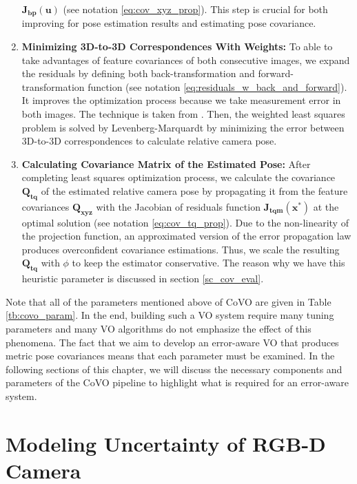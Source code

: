 \documentclass[12pt]{report}
\numberwithin{figure}{section}
\begin{document}
\begin{enumerate}
    $\mathbf{J_{bp}}(\mathbf{u})$ (see notation \eqref{eq:cov_xyz_prop}). This
    step is crucial for both improving for pose estimation results and
    estimating pose covariance.  
  \item \textbf{Minimizing 3D-to-3D Correspondences With Weights:} To able to
    take advantages of feature covariances of both consecutive images, we
    expand the residuals by defining both back-transformation and 
    forward-transformation
    function (see notation \eqref{eq:residuals_w_back_and_forward}).  It 
    improves
    the optimization process because we take measurement error in both images.
    The technique is taken from \parencite[see][101]{RichardHartley2003}.  
    Then, 
    the
    weighted least squares problem is solved by Levenberg-Marquardt by
    minimizing the error between 3D-to-3D correspondences to calculate relative
    camera pose.  
  \item \textbf{Calculating Covariance Matrix of the Estimated Pose:} After
    completing least squares optimization process, we calculate the covariance
    $\mathbf{Q_{tq}}$ of the estimated relative camera pose by propagating it
    from the feature covariances $\mathbf{Q_{xyz}}$ with the Jacobian of
    residuals function $\mathbf{J_{tqm}}(\mathbf{x^*})$ at the optimal 
    solution (see
    notation \eqref{eq:cov_tq_prop}).  Due to the non-linearity of the 
    projection
    function, an approximated version of the error propagation law produces
    overconfident covariance estimations. Thus, we scale the resulting
    $\mathbf{Q_{tq}}$ with $\phi$ to keep the estimator conservative.  The
    reason why we have this heuristic parameter is discussed in section
    \ref{sc_cov_eval}.  
\end{enumerate}

Note that all of the parameters mentioned above of CoVO are given in Table 
\ref{tb:covo_param}.  In the end, building such a VO system
require many tuning parameters and many VO algorithms do not emphasize the
effect of this phenomena.  The fact that we aim to develop an error-aware VO
that produces metric pose covariances means that each parameter must be
examined.  In the following sections of this chapter, we will discuss the
necessary components and parameters of the CoVO pipeline to highlight what is
required for an error-aware system.

\section{Modeling Uncertainty of RGB-D Camera} \label{sc_modeling_uncertainty_of_rgbd}
\end{document}
